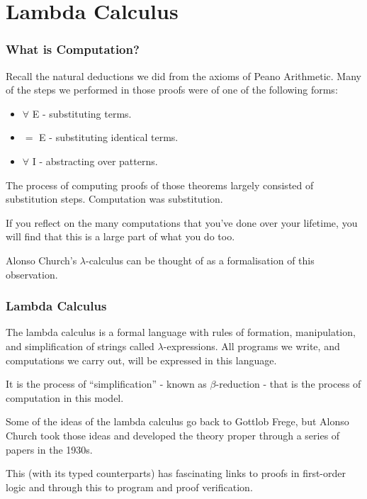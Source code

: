 \documentclass{beamer}
\begin{document}
\section{Lambda Calculus}

\begin{frame}
	\frametitle{What is Computation?}

	Recall the natural deductions we did from the axioms of Peano Arithmetic. Many of the steps we performed in those proofs were of one of the following forms: 

		\begin{itemize}
			\item $\forall$ E - substituting terms.
			\item $=$ E - substituting identical terms.
			\item $\forall$ I - abstracting over patterns. 
		\end{itemize}

	The process of computing proofs of those theorems largely consisted of substitution steps. Computation was substitution. 

	If you reflect on the many computations that you've done over your lifetime, you will find that this is a large part of what you do too.

	Alonso Church's $\lambda$-calculus can be thought of as a formalisation of this observation. 


\end{frame}

\begin{frame}
	\frametitle{Lambda Calculus}

	The lambda calculus is a formal language with rules of formation, manipulation, and simplification of strings called $\lambda$-expressions. All programs we write, and computations we carry out, will be expressed in this language.

	It is the process of ``simplification'' - known as $\beta$-reduction - that is the process of computation in this model.

	Some of the ideas of the lambda calculus go back to Gottlob Frege, but Alonso Church took those ideas and developed the theory proper through a series of papers in the 1930s. 

	This (with its typed counterparts) has fascinating links to proofs in first-order logic and through this to program and proof verification.

\end{frame}
\end{document}

